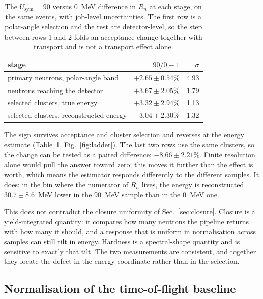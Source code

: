 \documentclass[aps,prc,twocolumn,superscriptaddress,showpacs,%
               nofootinbib,floatfix,longbibliography]{revtex4-2}
\newcommand{\Usym}{U_{\text{sym}}}
\begin{document}
\begin{table}[!t]
  \centering
  \caption{The $\Usym = 90$ versus $0$~MeV difference in $R_n$ at each
    stage, on the same events, with job-level uncertainties.  The first
    row is a polar-angle selection and the rest are detector-level, so
    the step between rows 1 and 2 folds an acceptance change together
    with transport and is not a transport effect alone.}
  \label{tab:ladder}
  \begin{ruledtabular}
  \begin{tabular}{lrr}
    stage & $90/0 - 1$ & $\sigma$ \\
    \hline
    primary neutrons, polar-angle band & $+2.65 \pm 0.54\%$ & 4.93 \\
    neutrons reaching the detector       & $+3.67 \pm 2.05\%$ & 1.79 \\
    selected clusters, true energy       & $+3.32 \pm 2.94\%$ & 1.13 \\
    selected clusters, reconstructed energy & $-3.04 \pm 2.30\%$ & 1.32 \\
  \end{tabular}
  \end{ruledtabular}
\end{table}

The sign survives acceptance and cluster selection and reverses at the
energy estimate (Table~\ref{tab:ladder}, Fig.~\ref{fig:ladder}).  The
last two rows use the same clusters, so the change can be tested as a
paired difference: $-8.66 \pm 2.21\%$.  Finite resolution alone would
pull the answer toward zero; this moves it further than the effect is
worth, which means the estimator responds differently to the different
samples.  It does: in the bin where the numerator of $R_n$ lives, the
energy is reconstructed $30.7 \pm 8.6$~MeV lower in the $90$~MeV sample
than in the $0$~MeV one.

This does not contradict the closure uniformity of
Sec.~\ref{sec:closure}.  Closure is a yield-integrated quantity: it
compares how many neutrons the pipeline returns with how many it should,
and a response that is uniform in normalisation across samples can still
tilt in energy.  Hardness is a spectral-shape quantity and is sensitive
to exactly that tilt.  The two measurements are consistent, and together
they locate the defect in the energy coordinate rather than in the
selection.

\subsection{Normalisation of the time-of-flight baseline}
\end{document}
